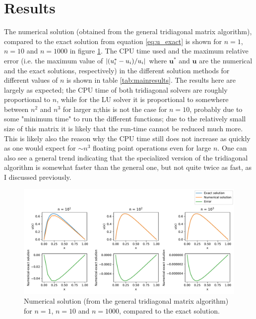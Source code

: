 \documentclass[a4paper,english]{article}
\renewcommand\vec{\mathbf}
\newcommand\norm[1]{\left\lvert#1\right\rvert}
\let\originalleft\left
\let\originalright\right
\renewcommand{\left}{\mathopen{}\mathclose\bgroup\originalleft}
\renewcommand{\right}{\aftergroup\egroup\originalright}
\begin{document}
\section{Results}
The numerical solution (obtained from the general tridiagonal matrix algorithm), compared to the exact solution from equation \ref{eq:u_exact} is shown for $n=1$, $n=10$ and $n=1000$ in figure \ref{fig:general_plot}. The CPU time used and the maximum relative error (i.e. the maximum value of $\norm{\left(u^*_i-u_i\right)/u_i}$ where $\vec{u}^*$ and $\vec{u}$ are the numerical and the exact solutions, respectively) in the different solution methods for different values of $n$ is shown in table \ref{tab:mainresults}. The results here are largely as expected; the CPU time of both tridiagonal solvers are roughly proportional to $n$, while for the LU solver it is proportional to somewhere between $n^2$ and $n^3$ for larger n;this is not the case for $n=10$, probably due to some "minimum time" to run the different functions; due to the relatively small size of this matrix it is likely that the run-time cannot be reduced much more. This is likely also the reason why the CPU time still does not increase as quickly as one would expect for $\sim n^3$ floating point operations even for large $n$. One can also see a general trend indicating that the specialized version of the tridiagonal algorithm is somewhat faster than the general one, but not quite twice as fast, as I discussed previously. \par
\begin{figure}[ht]
  \centering
  \includegraphics[width=0.96\linewidth]{general_plot.pdf}
  \caption{Numerical solution (from the general tridiagonal matrix algorithm) for $n=1$, $n=10$ and $n=1000$, compared to the exact solution.}
  \label{fig:general_plot}
\end{figure}
\end{document}
